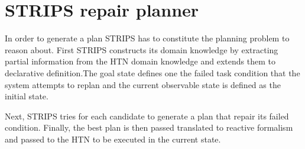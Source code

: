 \section{STRIPS repair planner}
In order to generate a plan STRIPS has to constitute the planning problem to reason about. First  STRIPS constructs its domain knowledge by extracting partial information from the HTN domain knowledge and extends them to declarative definition.The goal state defines one the failed task condition that  the system attempts to replan  and the current observable state is defined as the initial state.

Next, STRIPS tries for each candidate to generate a plan that repair its failed condition. Finally, the best plan is then passed translated to reactive formalism and passed to the HTN to be executed in the current state.

